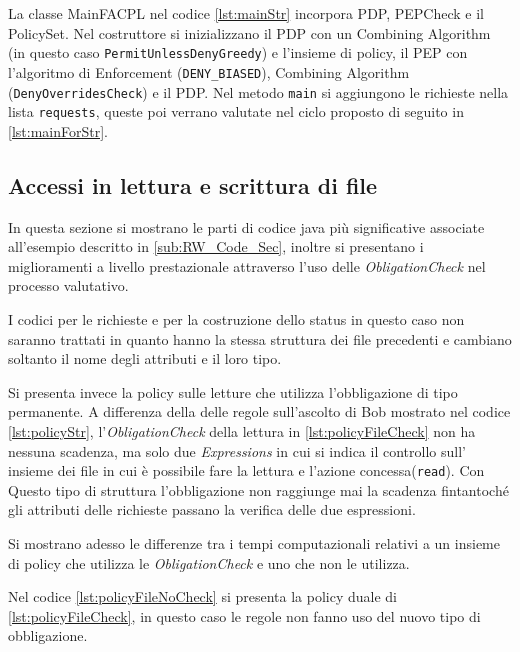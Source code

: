 La classe MainFACPL nel codice \ref{lst:mainStr} incorpora PDP, PEPCheck e il PolicySet. Nel costruttore si inizializzano
il PDP con un Combining Algorithm (in questo caso \texttt{PermitUnlessDenyGreedy}) e l'insieme di policy, il PEP con l'algoritmo di
Enforcement (\texttt{DENY\_BIASED}), Combining Algorithm (\texttt{DenyOverridesCheck}) e il PDP.
Nel metodo \texttt{main} si aggiungono le richieste nella lista \texttt{requests}, queste poi verrano
valutate nel ciclo proposto di seguito in \ref{lst:mainForStr}.

\subsection{Accessi in lettura e scrittura di file}
\label{sub:EsAccesJava}
In questa sezione si mostrano le parti di codice java più significative associate all'esempio descritto in \ref{sub:RW_Code_Sec},
inoltre si presentano i miglioramenti a livello prestazionale attraverso l'uso delle \emph{ObligationCheck}
nel processo valutativo.\par
\vspace{2mm}
I codici per le richieste e per la costruzione dello status in questo caso non saranno trattati
in quanto hanno la stessa struttura dei file precedenti e cambiano soltanto il nome degli attributi e il loro tipo.\par
Si presenta invece la policy sulle letture che utilizza l'obbligazione di tipo permanente. A differenza della
delle regole sull'ascolto di Bob mostrato nel codice \ref{lst:policyStr}, l'\emph{ObligationCheck} della lettura in
\ref{lst:policyFileCheck} non ha nessuna scadenza, ma solo due \emph{Expressions} in cui si indica il controllo sull'
insieme dei file in cui è possibile fare la lettura e l'azione concessa(\texttt{read}). Con Questo tipo di struttura
l'obbligazione non raggiunge mai la scadenza fintantoché gli attributi delle richieste passano la verifica delle due espressioni.

Si mostrano adesso le differenze tra i tempi computazionali relativi a un insieme di policy che utilizza le \emph{ObligationCheck}
e uno che non le utilizza.\par
Nel codice \ref{lst:policyFileNoCheck} si presenta la policy duale di \ref{lst:policyFileCheck},
in questo caso le regole non fanno uso del nuovo tipo di obbligazione.

